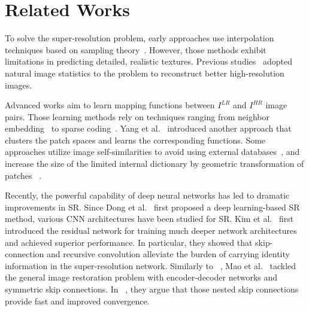 \documentclass[10pt,twocolumn,letterpaper]{article}
\begin{document}
	
	\section{Related Works}
	
	To solve the super-resolution problem, early approaches use interpolation techniques based on sampling theory~\cite{allebach1996edge, li2001new, zhang2006edge}. However, those methods exhibit limitations in predicting detailed, realistic textures.
	Previous studies~\cite{tai2010super, sun2008image} adopted natural image statistics to the problem to reconstruct better high-resolution images.
	
	Advanced works aim to learn mapping functions between $I^{LR}$ and  $I^{HR}$ image pairs.
	Those learning methods rely on techniques ranging from neighbor embedding~\cite{chang2004super, bevilacqua2012low, gao2012image, roweis2000nonlinear}  to sparse coding~\cite{yang2012coupled, yang2010image, timofte2014a+, zeyde2010single}.
	Yang et al.~\cite{yang2013fast} introduced another approach that clusters the patch spaces and learns the corresponding functions.
	Some approaches utilize image self-similarities to avoid using external databases~\cite{glasner2009super, freedman2011image, wang2015learning}, and
	increase the size of the limited internal dictionary by geometric transformation of patches  ~\cite{huang2015single}.
	
	Recently, the powerful capability of deep neural networks has led to dramatic improvements in SR.
	Since Dong et al.~\cite{dong2014learning, dong2016accelerating} first proposed a deep learning-based SR method, various CNN architectures have been studied for SR.
	Kim et al.~\cite{kim2016accurate, kim2016deeply} first introduced the residual network for training much deeper network architectures and achieved superior performance. In particular, they showed that skip-connection and recursive convolution alleviate the burden of carrying identity information in the super-resolution network.
	Similarly to ~\cite{ronneberger2015u}, Mao et al.~\cite{mao2016image} tackled the general image restoration problem with encoder-decoder networks and symmetric skip connections. In ~\cite{mao2016image}, they argue that those nested skip connections provide fast and improved convergence.
	
\end{document}
